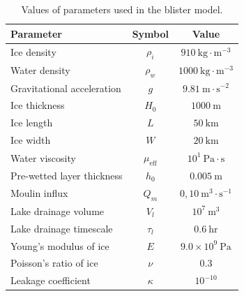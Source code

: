 \documentclass[draft]{agujournal2019}
\begin{document}
\begin{table}[htbp]
    \centering
    \caption{Values of parameters used in the blister model.}
    \begin{tabular}{lcc}
        \hline
        Parameter & Symbol & Value \\   
        \hline
        Ice density & $\rho_i$ & $910~\text{kg}\cdot\text{m}^{-3}$ \\
        Water density & $\rho_w$ & $1000~\text{kg}\cdot\text{m}^{-3}$ \\
        Gravitational acceleration & $g$ & $9.81~\text{m}\cdot\text{s}^{-2}$ \\
        Ice thickness & $H_0$ & $1000~\text{m}$ \\
        Ice length & $L$ & $50~\text{km}$ \\
        Ice width & $W$ & $20~\text{km}$ \\
        Water viscosity & $\mu_{\text{eff}}$ & $10^{1}~\text{Pa}\cdot\text{s}$ \\
        Pre-wetted layer thickness & $h_0$ & $0.005~\text{m}$ \\
        Moulin influx & $Q_m$ & $0,10~\text{m}^3\cdot\text{s}^{-1}$ \\
        Lake drainage volume & $V_l$ & $10^{7}~\text{m}^3$ \\
        Lake drainage timescale & $\tau_l$ & $0.6~\text{hr}$ \\
        Young's modulus of ice & $E$ & $9.0\times10^{9}~\text{Pa}$ \\
        Poisson's ratio of ice & $\nu$ & $0.3$ \\
        Leakage coefficient & $\kappa$ & $10^{-10}$\\
        \hline    
    \end{tabular}
    \label{tab:parameters}
\end{table}
\end{document}
